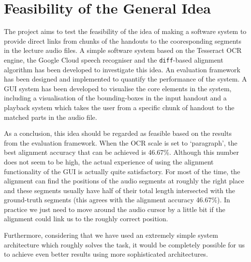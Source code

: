 \section{Feasibility of the General Idea}

The project aims to test the feasibility of the idea of making a software system to provide direct links from chunks of the handouts to the cooresponding segments in the lecture audio files. A simple software system based on the Tesseract OCR engine, the Google Cloud speech recogniser and the \texttt{diff}-based alignment algorithm has been developed to investigate this idea. An evaluation framework has been designed and implemented to quantify the performance of the system. A GUI system has been developed to visualise the core elements in the system, including a visualisation of the bounding-boxes in the input handout and a playback system which takes the user from a specific chunk of handout to the matched parts in the audio file.

As a conclusion, this idea should be regarded as feasible based on the results from the evaluation framework. When the OCR scale is set to `paragraph', the best alignment accuracy that can be achieved is 46.67\%. Although this number does not seem to be high, the actual experience of using the alignment functionality of the GUI is actually quite satisfactory. For most of the time, the alignment can find the positions of the audio segments at roughly the right place and these segments usually have half of their total length intersected with the ground-truth segments (this agrees with the alignment accuracy 46.67\%). In practice we just need to move around the audio cursor by a little bit if the alignment could link us to the roughly correct position.

Furthermore, considering that we have used an extremely simple system architecture which roughly solves the task, it would be completely possible for us to achieve even better results using more sophisticated architectures. 